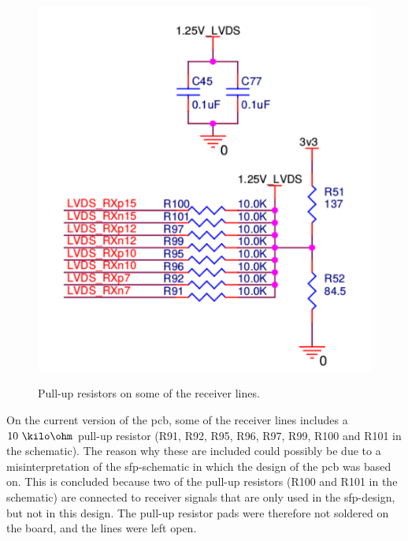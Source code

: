 \documentclass[main.tex]{subfiles}
\begin{document}
\begin{figure}[H] %
\includegraphics[width = 7 cm]{../img/pullups}  \\[0.1 cm]
\caption{Pull-up resistors on some of the receiver lines.}
\label{fig:pullups}
\end{figure}

On the current version of the \gls{pcb}, some of the receiver lines includes a $10~\kilo\ohm$ pull-up resistor (R91, R92, R95, R96, R97, R99, R100 and R101 in the schematic). The reason why these are included could possibly be due to a misinterpretation of the \gls{sfp}-schematic in which the design of the \gls{pcb} was based on. This is concluded because two of the pull-up resistors (R100 and R101 in the schematic) are connected to receiver signals that are only used in the \gls{sfp}-design, but not in this design. The pull-up resistor pads were therefore not soldered on the board, and the lines were left open.


\end{document}
